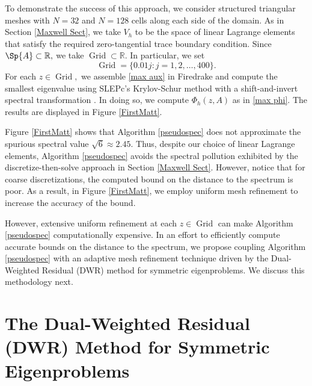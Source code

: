 
To demonstrate the success of this approach, we consider structured triangular meshes with $N = 32$ and $N=128$ cells along each side of the domain. As in Section \ref{Maxwell Sect}, we take $V_h$ to be the space of linear Lagrange elements that satisfy the required zero-tangential trace boundary condition. Since $\Sp{A} \subset \mathbb{R},$ we take $\operatorname{Grid} \subset \mathbb{R}.$ In particular, we set
\begin{equation} \label{1grid}
    \operatorname{Grid} = \{0.01j : j = 1, 2, \dots, 400 \}.
\end{equation}
For each $z \in \operatorname{Grid},$ we assemble \eqref{max aux} in Firedrake and compute the smallest eigenvalue using SLEPc's Krylov-Schur method with a shift-and-invert spectral transformation \cite{Firedrake, slep}. In doing so, we compute $\Phi_h(z, A)$ as in \eqref{max phi}. The results are displayed in Figure \ref{FirstMatt}. 

% 



Figure \ref{FirstMatt} shows that Algorithm \ref{pseudospec} does not approximate the spurious spectral value $\sqrt{6} \approx 2.45.$ Thus, despite our choice of linear Lagrange elements, 
Algorithm \ref{pseudospec} avoids the spectral pollution exhibited by the discretize-then-solve approach in Section \ref{Maxwell Sect}. However, notice that for coarse discretizations, the computed bound on the distance to the spectrum is poor. As a result,  in Figure \ref{FirstMatt}, we employ uniform mesh refinement to increase the accuracy of the bound. 

However, extensive uniform refinement at each $z \in \operatorname{Grid}$ can make Algorithm \ref{pseudospec} computationally expensive. In an effort to efficiently compute accurate bounds on the distance to the spectrum, we propose coupling Algorithm \ref{pseudospec} with an adaptive mesh refinement technique driven by the Dual-Weighted Residual (DWR) method for symmetric eigenproblems. We discuss this methodology next.


\section{The Dual-Weighted Residual (DWR) Method for Symmetric Eigenproblems} \label{DWR sect}

